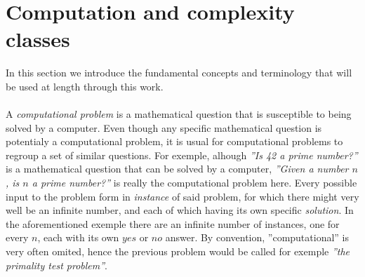 %
%

\section{Computation and complexity classes}
	In this section we introduce the fundamental concepts and terminology that will be used at length through this work.

	\paragraph{}
	A \emph{computational problem} is a mathematical question that is susceptible to being solved by a computer.
	Even though any specific mathematical question is potentialy a computational problem, it is usual for computational problems to regroup a set of similar questions.
	For exemple, alhough \textit{''Is 42 a prime number?''} is a mathematical question that can be solved by a computer, \textit{''Given a number $n$, is $n$ a prime number?''} is really the computational problem here.
	Every possible input to the problem form in \emph{instance} of said problem, for which there might very well be an infinite number, and each of which having its own specific \emph{solution}.
	In the aforementioned exemple there are an infinite number of instances, one for every $n$, each with its own $yes$ or $no$ answer.
	By convention, ''computational'' is very often omited, hence the previous problem would be called for exemple \textit{''the primality test \emph{problem}''}.

